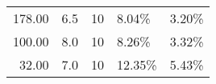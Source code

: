 \documentclass[openany]{article}  %
\begin{document}
\begin{table}
\begin{center}
\begin{tabular}{rrl|ll}
  178.00 &                      6.5 &                     10 &   8.04\% &   3.20\% \\
  100.00 &                      8.0 &                     10 &   8.26\% &   3.32\% \\
   32.00 &                      7.0 &                     10 &  12.35\% &   5.43\% \\

\end{tabular}
\end{center}
\end{table}
\end{document}
